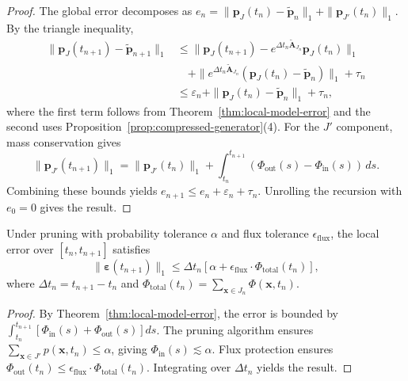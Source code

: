 \documentclass[review,onefignum,onetabnum]{siamart171218}
\begin{document}
\begin{proof}
The global error decomposes as $e_n = \|\boldsymbol{p}_J(t_n) - \widetilde{\boldsymbol{p}}_n\|_1 + \|\boldsymbol{p}_{J'}(t_n)\|_1$. By the triangle inequality,
\begin{align*}
\|\boldsymbol{p}_J(t_{n+1}) - \widetilde{\boldsymbol{p}}_{n+1}\|_1 &\leq \|\boldsymbol{p}_J(t_{n+1}) - e^{\Delta t_n \widetilde{\mathbf{A}}_{J_n}}\boldsymbol{p}_J(t_n)\|_1 \\
&\quad + \|e^{\Delta t_n \widetilde{\mathbf{A}}_{J_n}}(\boldsymbol{p}_J(t_n) - \widetilde{\boldsymbol{p}}_n)\|_1 + \tau_n \\
&\leq \varepsilon_n + \|\boldsymbol{p}_J(t_n) - \widetilde{\boldsymbol{p}}_n\|_1 + \tau_n,
\end{align*}
where the first term follows from Theorem~\ref{thm:local-model-error} and the second uses Proposition~\ref{prop:compressed-generator}(4). For the $J'$ component, mass conservation gives
\begin{equation}
\|\boldsymbol{p}_{J'}(t_{n+1})\|_1 = \|\boldsymbol{p}_{J'}(t_n)\|_1 + \int_{t_n}^{t_{n+1}} (\Phi_{\mathrm{out}}(s) - \Phi_{\mathrm{in}}(s)) \, ds.
\end{equation}
Combining these bounds yields $e_{n+1} \leq e_n + \varepsilon_n + \tau_n$. Unrolling the recursion with $e_0 = 0$ gives the result.
\end{proof}

\begin{corollary}
\label{cor:local-error-pruning}
Under pruning with probability tolerance $\alpha$ and flux tolerance $\epsilon_{\mathrm{flux}}$, the local error over $[t_n, t_{n+1}]$ satisfies
\begin{equation}
\|\boldsymbol{\varepsilon}(t_{n+1})\|_1 \leq \Delta t_n \left[\alpha + \epsilon_{\mathrm{flux}} \cdot \Phi_{\mathrm{total}}(t_n)\right],
\end{equation}
where $\Delta t_n = t_{n+1} - t_n$ and $\Phi_{\mathrm{total}}(t_n) = \sum_{\boldsymbol{x} \in J_n} \Phi(\boldsymbol{x}, t_n)$.
\end{corollary}

\begin{proof}
By Theorem~\ref{thm:local-model-error}, the error is bounded by $\int_{t_n}^{t_{n+1}} [\Phi_{\mathrm{in}}(s) + \Phi_{\mathrm{out}}(s)] ds$. The pruning algorithm ensures $\sum_{\boldsymbol{x} \in J'} p(\boldsymbol{x}, t_n) \leq \alpha$, giving $\Phi_{\mathrm{in}}(s) \lesssim \alpha$. Flux protection ensures $\Phi_{\mathrm{out}}(t_n) \leq \epsilon_{\mathrm{flux}} \cdot \Phi_{\mathrm{total}}(t_n)$. Integrating over $\Delta t_n$ yields the result.
\end{proof}
\end{document}
